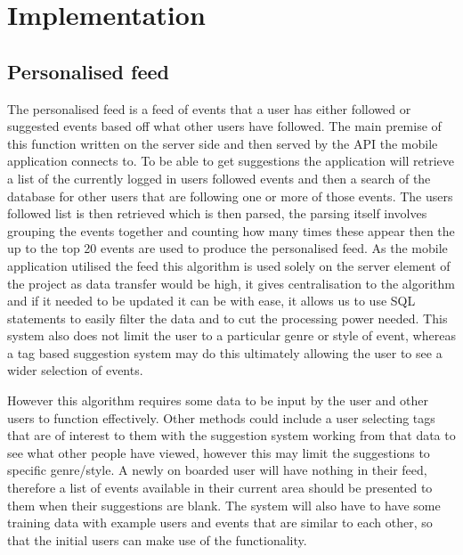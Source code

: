 \chapter{Implementation}

	\section{Personalised feed}
		The personalised feed is a feed of events that a user has either followed or suggested events based off what other users have followed. The main premise of this function written on the server side and then served by the API the mobile application connects to. To be able to get suggestions the application will retrieve a list of the currently logged in users followed events and then a search of the database for other users that are following one or more of those events. The users followed list is then retrieved which is then parsed, the parsing itself involves grouping the events together and counting how many times these appear then the up to the top 20 events are used to produce the personalised feed. As the mobile application utilised the feed this algorithm is used solely on the server element of the project as data transfer would be high, it gives centralisation to the algorithm and if it needed to be updated it can be with ease, it allows us to use SQL statements to easily filter the data and to cut the processing power needed. This system also does not limit the user to a particular genre or style of event, whereas a tag based suggestion system may do this ultimately allowing the user to see a wider selection of events. 

		However this algorithm requires some data to be input by the user and other users to function effectively. Other methods could include a user selecting tags that are of interest to them with the suggestion system working from that data to see what other people have viewed, however this may limit the suggestions to  specific genre/style. A  newly on boarded user will have nothing in their feed, therefore a list of events available in their current area should be presented to them when their suggestions are blank. The system will also have to have some training data with example users and events that are similar to each other, so that the initial users can make use of the functionality. 


